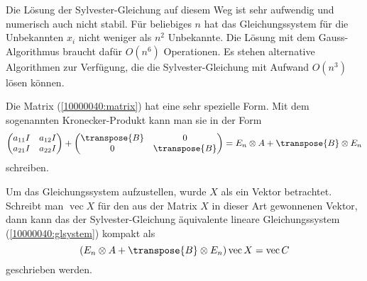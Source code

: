 \begin{diskussion}
Die Lösung der Sylvester-Gleichung auf diesem Weg ist sehr aufwendig und
numerisch auch nicht stabil. 
Für beliebiges $n$ hat das Gleichungssystem für die Unbekannten $x_i$ 
nicht weniger als $n^2$ Unbekannte.
Die Lösung mit dem Gauss-Algorithmus braucht dafür $O(n^6)$ Operationen.
Es stehen alternative Algorithmen zur Verfügung, die die Sylvester-Gleichung
mit Aufwand $O(n^3)$ lösen können.

Die Matrix (\ref{10000040:matrix}) hat eine sehr spezielle Form.
Mit dem sogenannten Kronecker-Produkt kann man sie in der Form
\[
\begin{pmatrix}
a_{11}I&a_{12}I\\
a_{21}I&a_{22}I
\end{pmatrix}
+
\begin{pmatrix}
\transpose{B}&0\\
0&\transpose{B}
\end{pmatrix}
=
E_n \otimes A
+
\transpose{B} \otimes E_n
\]
schreiben.

Um das Gleichungssystem aufzustellen, wurde $X$ als ein Vektor betrachtet.
Schreibt man $\operatorname{vec}X$ für den aus der Matrix $X$ in dieser Art
gewonnenen Vektor, dann kann das der Sylvester-Gleichung äquivalente
lineare Gleichungssystem (\ref{10000040:glsystem}) kompakt als
\[
(E_n \otimes A
+
\transpose{B} \otimes E_n)\operatorname{vec}X
=
\operatorname{vec}C
\]
geschrieben werden.
\end{diskussion}


